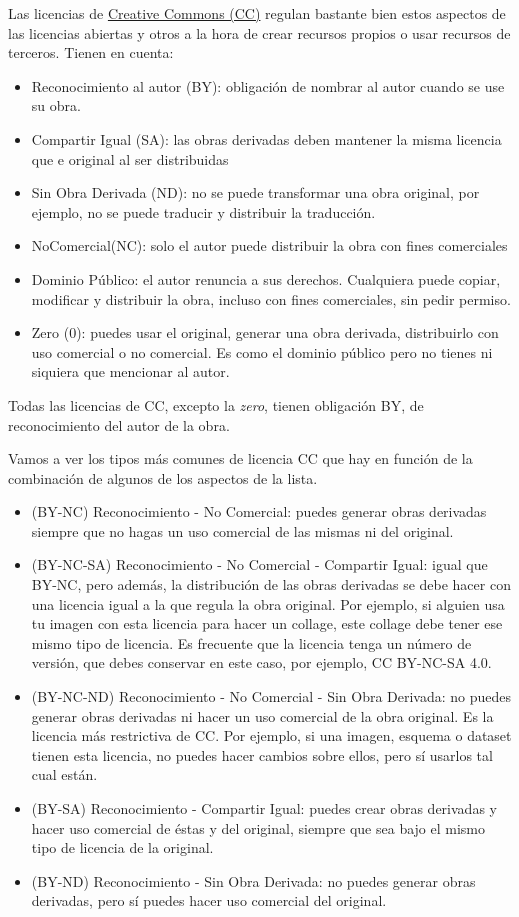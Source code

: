 Las licencias de \href{https://creativecommons.org}{Creative Commons (CC)} regulan bastante bien estos aspectos de las licencias abiertas y otros a la hora de crear recursos propios o usar recursos de terceros. Tienen en cuenta:
\begin{itemize}
    \item Reconocimiento al autor (BY): obligación de nombrar al autor cuando se use su obra.
    \item Compartir Igual (SA): las obras derivadas deben mantener la misma licencia que e original al ser distribuidas
    \item Sin Obra Derivada (ND): no se puede transformar una obra original, por ejemplo, no se puede traducir y distribuir la traducción.
    \item NoComercial(NC): solo el autor puede distribuir la obra con fines comerciales
    \item Dominio Público: el autor renuncia a sus derechos. Cualquiera puede copiar, modificar y distribuir la obra, incluso con fines comerciales, sin pedir permiso.
    \item Zero (0): puedes usar el original, generar una obra derivada, distribuirlo con uso comercial o no comercial. Es como el dominio público pero no tienes ni siquiera que mencionar al autor.
\end{itemize}

Todas las licencias de CC, excepto la \textit{zero}, tienen obligación BY, de reconocimiento del autor de la obra.

Vamos a ver los tipos más comunes de licencia CC que hay en función de la combinación de algunos de los aspectos de la lista.
\begin{itemize}
    \item (BY-NC) Reconocimiento - No Comercial: puedes generar obras derivadas siempre que no hagas un uso comercial de las mismas ni del original. 
    \item (BY-NC-SA) Reconocimiento - No Comercial - Compartir Igual: igual que BY-NC, pero además, la distribución de las obras derivadas se debe hacer con una licencia igual a la que regula la obra original. Por ejemplo, si alguien usa tu imagen con esta licencia para hacer un collage, este collage debe tener ese mismo tipo de licencia. Es frecuente que la licencia tenga un número de versión, que debes conservar en este caso, por ejemplo, CC BY-NC-SA 4.0.
    \item (BY-NC-ND) Reconocimiento - No Comercial - Sin Obra Derivada:  no puedes generar obras derivadas ni hacer un uso comercial de la obra original. Es la licencia más restrictiva de CC. Por ejemplo, si una imagen, esquema o dataset tienen esta licencia, no puedes hacer cambios sobre ellos, pero sí usarlos tal cual están.
    \item (BY-SA) Reconocimiento - Compartir Igual: puedes crear obras derivadas y hacer uso comercial de éstas y del original, siempre que sea bajo el mismo tipo de licencia de la original.
    \item  (BY-ND) Reconocimiento - Sin Obra Derivada: no puedes generar obras derivadas, pero sí puedes hacer uso comercial del original. 
\end{itemize}

